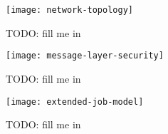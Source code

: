\begin{figure}
  \begin{center}
    \texttt{[image: network-topology]}
  \end{center}
  \caption[Network  Topology]{TODO: fill me in}
  \label{fig:net-top}
\end{figure}

\begin{figure}
  \begin{center}
    \texttt{[image: message-layer-security]}
  \end{center}
  \caption[Message Layer Security]{TODO: fill me in}
  \label{fig:net-mls}
\end{figure}

\begin{figure}
  \begin{center}
    \texttt{[image: extended-job-model]}
  \end{center}
  \caption[Job Model (extended)]{TODO: fill me in}
  \label{fig:bes-extended-xen}
\end{figure}

